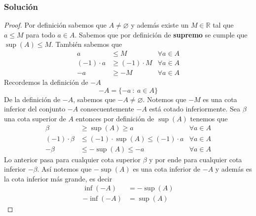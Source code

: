\documentclass[a4paper]{article}
\begin{document}
\subsubsection*{Solución}
\begin{proof}
    Por definición sabemos que \(A \neq \varnothing\) y además existe un \(M \in \mathbb{R}\)
    tal que \(a \leq M\) para todo \(a \in A\). Sabemos que por definición de \textbf{supremo}
    se cumple que \(\sup{\left(A\right)} \leq M\). 
    También sabemos que
    \begin{align*}
        a &\leq M &\forall a \in A \\
        (-1) \cdot a &\geq (-1) \cdot M &\forall a \in A \\
        -a &\geq -M &\forall a \in A
    \end{align*}
    Recordemos la definición de \(-A\)
    \[
        -A = \{-a \ : \ a \in A\}
    \]
    De la definición de \(-A\), sabemos que \(-A \neq \varnothing\).
    Notemos que \(-M\) es una cota inferior del conjunto \(-A\)
    consecuentemente \(-A\) está cotado inferiormente. Sea \(\beta\) una cota 
    superior de \(A\) entonces por definición de \(\sup{\left(A\right)}\) tenemos que
    \begin{align*}
        \beta &\geq \sup{\left(A\right)} \geq a & \forall a \in A \\
        (-1) \cdot \beta &\leq (-1) \cdot \sup{\left(A\right)} \leq (-1) \cdot a & \forall a \in A \\
        -\beta &\leq -\sup{\left(A\right)} \leq -a & \forall a \in A
    \end{align*}
    Lo anterior pasa para cualquier cota superior \(\beta\) y por ende para cualquier cota inferior \(-\beta\).
    \newline
    Así notemos que \(-\sup{\left(A\right)}\) es una cota inferior de \(-A\) y además es la cota inferior 
    más grande, es decir
    \begin{align*}
        \inf{\left(-A\right)} &= -\sup{\left(A\right)} \\
        -\inf{\left(-A\right)} &= \sup{\left(A\right)}
    \end{align*}
\end{proof}
\end{document}
